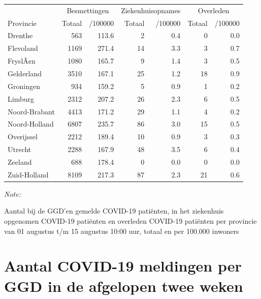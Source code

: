 \documentclass[
  english,
  man,floatsintext]{apa6}
\begin{document}
\begin{table}
\centering
\begin{threeparttable}
\begin{tabular}{lrrrrrr}
\toprule
\multicolumn{1}{c}{ } & \multicolumn{2}{c}{Besmettingen} & \multicolumn{2}{c}{Ziekenhuisopnames} & \multicolumn{2}{c}{Overleden} \\
\cmidrule(l{3pt}r{3pt}){2-3} \cmidrule(l{3pt}r{3pt}){4-5} \cmidrule(l{3pt}r{3pt}){6-7}
Provincie & Totaal & /100000 & Totaal & /100000 & Totaal & /100000\\
\midrule
Drenthe & 563 & 113.6 & 2 & 0.4 & 0 & 0.0\\
Flevoland & 1169 & 271.4 & 14 & 3.3 & 3 & 0.7\\
FryslÃ¢n & 1080 & 165.7 & 9 & 1.4 & 3 & 0.5\\
Gelderland & 3510 & 167.1 & 25 & 1.2 & 18 & 0.9\\
Groningen & 934 & 159.2 & 5 & 0.9 & 1 & 0.2\\
Limburg & 2312 & 207.2 & 26 & 2.3 & 6 & 0.5\\
Noord-Brabant & 4413 & 171.2 & 29 & 1.1 & 4 & 0.2\\
Noord-Holland & 6807 & 235.7 & 86 & 3.0 & 15 & 0.5\\
Overijssel & 2212 & 189.4 & 10 & 0.9 & 3 & 0.3\\
Utrecht & 2288 & 167.9 & 48 & 3.5 & 6 & 0.4\\
Zeeland & 688 & 178.4 & 0 & 0.0 & 0 & 0.0\\
Zuid-Holland & 8109 & 217.3 & 87 & 2.3 & 21 & 0.6\\
\bottomrule
\end{tabular}
\begin{tablenotes}
\item \textit{Note: } 
\item Aantal bij de GGD’en gemelde COVID-19 patiënten, in het ziekenhuis opgenomen COVID-19 patiënten en overleden COVID-19 patiënten per provincie van 01 augustus t/m 15 augustus 10:00 uur, totaal en per 100.000 inwoners
\end{tablenotes}
\end{threeparttable}
\end{table}

\newpage

\hypertarget{aantal-covid-19-meldingen-per-ggd-in-de-afgelopen-twee-weken}{%
\section{Aantal COVID-19 meldingen per GGD in de afgelopen twee weken}\label{aantal-covid-19-meldingen-per-ggd-in-de-afgelopen-twee-weken}}
\end{document}
